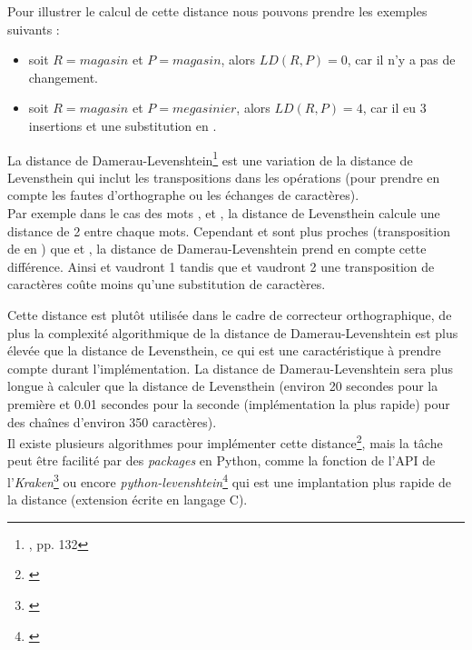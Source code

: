 Pour illustrer le calcul de cette distance nous pouvons prendre les exemples suivants :

\begin{itemize}
    \item soit $R = magasin$ et $P= magasin$, alors $LD(R, P) = 0$, car il n'y a pas de changement.
    \item soit $R = magasin$ et $P= megasinier $, alors $LD(R, P) = 4$, car il eu 3 insertions  et une substitution  en . 
\end{itemize} 
\bigskip
La distance de Damerau-Levenshtein\footnote{\cite{chaumartin_traitement_2020}, pp. 132} est une variation de la distance de Levensthein qui inclut les transpositions dans les opérations (pour prendre en compte les fautes d'orthographe ou les échanges de caractères).\\ 

Par exemple dans le cas des mots ,  et , la distance de Levensthein calcule une distance de 2 entre chaque mots. Cependant  et  sont plus proches (transposition de  en ) que  et , la distance de Damerau-Levenshtein prend en compte cette différence. Ainsi  et  vaudront 1 tandis que  et  vaudront 2 une transposition de caractères coûte moins qu'une substitution de caractères. 

Cette distance est plutôt utilisée dans le cadre de correcteur orthographique, de plus la complexité algorithmique de la distance de Damerau-Levenshtein est plus élevée que la distance de Levensthein, ce qui est une caractéristique à prendre compte durant l'implémentation. La distance de Damerau-Levenshtein sera plus longue à calculer que la distance de Levensthein (environ 20 secondes pour la première et 0.01 secondes pour la seconde (implémentation la plus rapide) pour des chaînes d'environ 350 caractères).\\

Il existe plusieurs algorithmes pour implémenter cette distance\footnote{\cite{noauthor_algorithm_nodate}}, mais la tâche peut être facilité par des \textit{packages} en Python, comme la fonction  de l'API de l'\textit{Kraken}\footnote{\cite{noauthor_kraken_nodate}} ou encore  \textit{python-levenshtein}\footnote{\cite{noauthor_python-levenshtein_nodate}} qui est une implantation plus rapide de la distance (extension écrite en langage C).\\

